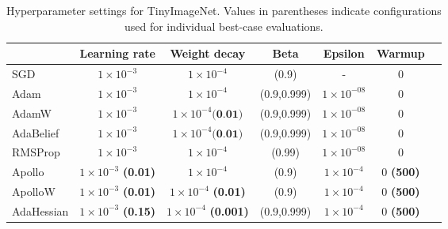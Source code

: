 \begin{table}[h!]
    \centering
    \caption{Hyperparameter settings for TinyImageNet. Values in parentheses indicate configurations used for individual best-case evaluations. }
    \label{tab:tiny-real-comp}
    \begin{tabular}{lcccccc}  %
        \toprule
        & \textbf{Learning rate} & \textbf{Weight decay} & \textbf{Beta} & \textbf{Epsilon} & \textbf{Warmup}  \\
        \midrule
        SGD         & $1 \times 10^{-3}$ & $1 \times 10 ^{-4} $ & (0.9) & - & 0  \\
        Adam        & $1 \times 10^{-3}$ & $1 \times 10 ^{-4} $ & (0.9,0.999) & $1 \times 10^{-08}$ & 0     \\
        AdamW       & $1 \times 10^{-3}$ & $1 \times 10 ^{-4} \textbf{(0.01)} $ & (0.9,0.999) & $1 \times 10^{-08}$ & 0 \\
        AdaBelief   & $1 \times 10^{-3}$ & $1 \times 10 ^{-4} \textbf{(0.01)}$ & (0.9,0.999) & $1 \times 10^{-08}$ & 0  \\
        RMSProp     & $1 \times 10^{-3}$ & $1 \times 10 ^{-4} $ & (0.99) & $1 \times 10^{-08}$ & 0 \\
        Apollo      & $1 \times 10^{-3}$ \textbf{(0.01)} & $1 \times 10 ^{-4}$ & (0.9) & $1 \times 10 ^{-4} $ & 0 \textbf{(500)}\\
        ApolloW     & $1 \times 10^{-3}$ \textbf{(0.01)} & $1 \times 10 ^{-4} $ \textbf{(0.01)} & (0.9) & $1 \times 10 ^{-4} $ & 0 \textbf{(500)}  \\
        AdaHessian  & $1 \times 10^{-3}$ \textbf{(0.15)} & $1 \times 10 ^{-4}$  \textbf{(0.001)} & (0.9,0.999) &$1 \times 10 ^{-4} $& 0 \textbf{(500)} \\
        \bottomrule
    \end{tabular}
\end{table}

